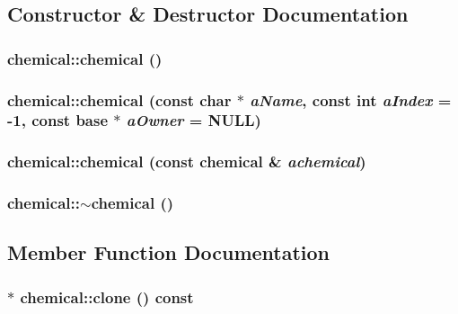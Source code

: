 \subsection{Constructor \& Destructor Documentation}
\hypertarget{classchemical_af734c449b8e918db03241008b6571743}{
\subsubsection[{chemical}]{\setlength{\rightskip}{0pt plus 5cm}chemical::chemical ()}}
\label{classchemical_af734c449b8e918db03241008b6571743}
\hypertarget{classchemical_a2d697470e1e62aee94b221d27dc6ab7f}{
\subsubsection[{chemical}]{\setlength{\rightskip}{0pt plus 5cm}chemical::chemical (const char $\ast$ {\em aName}, \/  const int {\em aIndex} = {\ttfamily -\/1}, \/  const {\bf base} $\ast$ {\em aOwner} = {\ttfamily NULL})}}
\label{classchemical_a2d697470e1e62aee94b221d27dc6ab7f}
\hypertarget{classchemical_a3e96e0469b288d962307fc6a89801262}{
\subsubsection[{chemical}]{\setlength{\rightskip}{0pt plus 5cm}chemical::chemical (const {\bf chemical} \& {\em achemical})}}
\label{classchemical_a3e96e0469b288d962307fc6a89801262}
\hypertarget{classchemical_ae60ef5faf85286058349de11ae1c7a5a}{
\subsubsection[{$\sim$chemical}]{\setlength{\rightskip}{0pt plus 5cm}chemical::$\sim$chemical ()}}
\label{classchemical_ae60ef5faf85286058349de11ae1c7a5a}


\subsection{Member Function Documentation}
\hypertarget{classchemical_aee0689e71b3bfe7f7dbd91009b707fd5}{
\subsubsection[{clone}]{ $\ast$ chemical::clone () const}}
\label{classchemical_aee0689e71b3bfe7f7dbd91009b707fd5}


